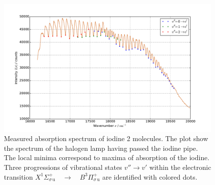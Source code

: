 \begin{figure}
    \centering
    \includegraphics[width=\pltw]{analysis/figures/absorp_03.pdf}
    \caption{Measured absorption spectrum of iodine 2 molecules. The plot show the spectrum of 
    the halogen lamp having passed the iodine pipe. The local minima correspond to maxima of 
    absorption of the iodine. Three progressions of vibrational states $v'' \rightarrow v'$
    within the electronic transition 
    $ X ^1\Sigma_{\sigma \, \mathrm{u}}^{+} \quad \rightarrow \quad B ^3\Pi_{\sigma \, \mathrm{u}}^{+}$
    are identified with colored dots. }
    \label{fig:absorp}
\end{figure}

